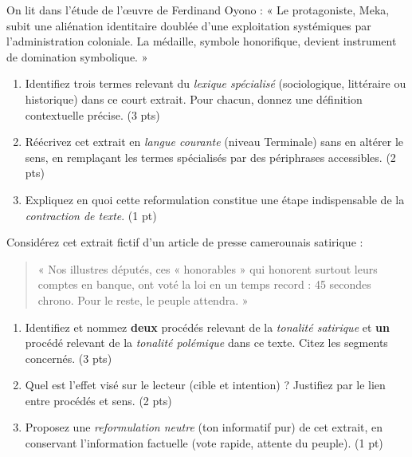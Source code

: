 \documentclass[11pt]{article}
\begin{document}
\begin{exercice}
On lit dans l'étude de l'œuvre de Ferdinand Oyono : « Le protagoniste, Meka, subit une aliénation identitaire doublée d'une exploitation systémiques par l'administration coloniale. La médaille, symbole honorifique, devient instrument de domination symbolique. »
\begin{enumerate}
    \item Identifiez trois termes relevant du \textit{lexique spécialisé} (sociologique, littéraire ou historique) dans ce court extrait. Pour chacun, donnez une définition contextuelle précise. (3 pts)
    \item Réécrivez cet extrait en \textit{langue courante} (niveau Terminale) sans en altérer le sens, en remplaçant les termes spécialisés par des périphrases accessibles. (2 pts)
    \item Expliquez en quoi cette reformulation constitue une étape indispensable de la \textit{contraction de texte}. (1 pt)
\end{enumerate}
\end{exercice}

\begin{exercice}
Considérez cet extrait fictif d'un article de presse camerounais satirique : 
\begin{quote}
« Nos illustres députés, ces « honorables » qui honorent surtout leurs comptes en banque, ont voté la loi en un temps record : 45 secondes chrono. Pour le reste, le peuple attendra. »
\end{quote}
\begin{enumerate}
    \item Identifiez et nommez \textbf{deux} procédés relevant de la \textit{tonalité satirique} et \textbf{un} procédé relevant de la \textit{tonalité polémique} dans ce texte. Citez les segments concernés. (3 pts)
    \item Quel est l'effet visé sur le lecteur (cible et intention) ? Justifiez par le lien entre procédés et sens. (2 pts)
    \item Proposez une \textit{reformulation neutre} (ton informatif pur) de cet extrait, en conservant l'information factuelle (vote rapide, attente du peuple). (1 pt)
\end{enumerate}
\end{exercice}
\end{document}
